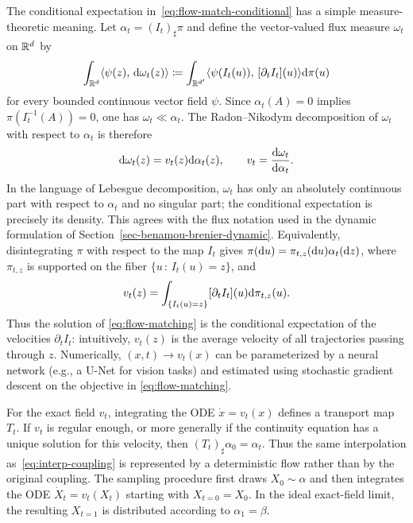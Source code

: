 The conditional expectation in~\eqref{eq:flow-match-conditional} has a simple measure-theoretic meaning. Let $\alpha_t=(I_t)_\sharp\pi$ and define the vector-valued flux measure $\omega_t$ on $\mathbb{R}^d$ by
\[
	\int_{\mathbb{R}^d}\langle \psi(z),\,\mathrm{d}\omega_t(z)\rangle
	\coloneqq
	\int_{\mathbb{R}^{d'}}\langle \psi(I_t(u)),\,[\partial_t I_t](u)\rangle\mathrm{d}\pi(u)
\]
for every bounded continuous vector field $\psi$. Since $\alpha_t(A)=0$ implies $\pi(I_t^{-1}(A))=0$, one has $\omega_t\ll\alpha_t$. The Radon--Nikodym decomposition of $\omega_t$ with respect to $\alpha_t$ is therefore
\[
	\mathrm{d}\omega_t(z)=v_t(z)\mathrm{d}\alpha_t(z),
	\qquad
	v_t=\frac{\mathrm{d}\omega_t}{\mathrm{d}\alpha_t}.
\]
In the language of Lebesgue decomposition, $\omega_t$ has only an absolutely continuous part with respect to $\alpha_t$ and no singular part; the conditional expectation is precisely its density. This agrees with the flux notation used in the dynamic formulation of Section~\ref{sec-benamou-brenier-dynamic}.
Equivalently, disintegrating $\pi$ with respect to the map $I_t$ gives $\pi(\mathrm{d} u)=\pi_{t,z}(\mathrm{d} u)\alpha_t(\mathrm{d} z)$, where $\pi_{t,z}$ is supported on the fiber $\{u\,:\,I_t(u)=z\}$, and
\[
	v_t(z)=\int_{\{I_t(u)=z\}}[\partial_t I_t](u)\mathrm{d}\pi_{t,z}(u).
\]
Thus the solution of \eqref{eq:flow-matching} is the conditional expectation of the velocities $\partial_t I_t$: intuitively, $v_t(z)$ is the average velocity of all trajectories passing through $z$.
%
Numerically, $(x,t) \to v_t(x)$ can be parameterized by a neural network (e.g., a U-Net for vision tasks) and estimated using stochastic gradient descent on the objective in \eqref{eq:flow-matching}.
%


For the exact field $v_t$, integrating the ODE $\dot{x}=v_t(x)$ defines a transport map $T_t$. If $v_t$ is regular enough, or more generally if the continuity equation has a unique solution for this velocity, then $(T_t)_\sharp\alpha_0=\alpha_t$. Thus the same interpolation as~\eqref{eq:interp-coupling} is represented by a deterministic flow rather than by the original coupling.
The sampling procedure first draws $X_0 \sim \alpha$ and then integrates the ODE $\dot{X}_t = v_t(X_t)$ starting with $X_{t=0} = X_0$.
In the ideal exact-field limit, the resulting $X_{t=1}$ is distributed according to $\alpha_1 = \beta$.

